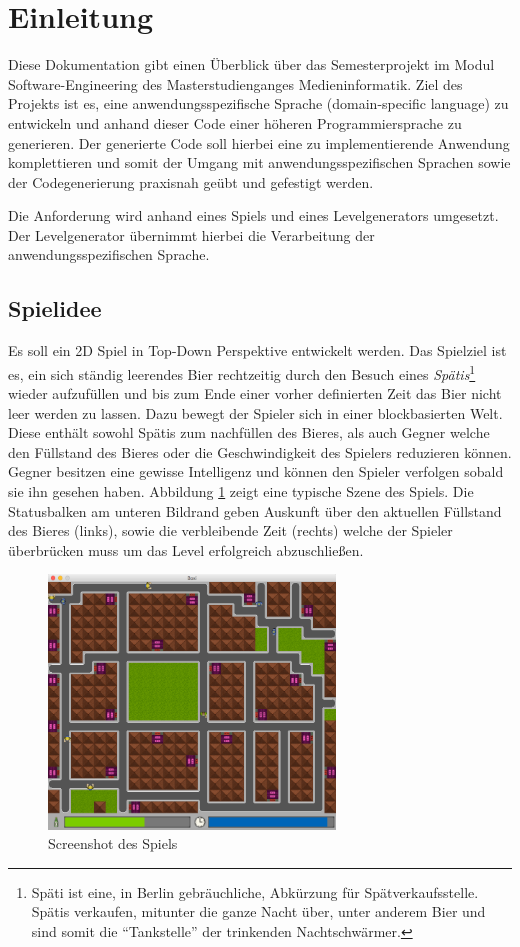 \section{Einleitung}

Diese Dokumentation gibt einen Überblick über das Semesterprojekt im Modul Software-Engineering des Masterstudienganges Medieninformatik.
Ziel des Projekts ist es, eine anwendungsspezifische Sprache (domain-specific language) zu entwickeln und anhand dieser Code einer höheren Programmiersprache zu generieren.
Der generierte Code soll hierbei eine zu implementierende Anwendung komplettieren und somit der Umgang mit anwendungsspezifischen Sprachen sowie der Codegenerierung praxisnah geübt und gefestigt werden.

Die Anforderung wird anhand eines Spiels und eines Levelgenerators umgesetzt.
Der Levelgenerator übernimmt hierbei die Verarbeitung der anwendungsspezifischen Sprache.

\subsection{Spielidee}

Es soll ein 2D Spiel in Top-Down Perspektive entwickelt werden.
Das Spielziel ist es, ein sich ständig leerendes Bier rechtzeitig durch den Besuch eines \textit{Spätis}\footnote{Späti ist eine, in Berlin gebräuchliche, Abkürzung für Spätverkaufsstelle. Spätis verkaufen, mitunter die ganze Nacht über, unter anderem Bier und sind somit die ``Tankstelle'' der trinkenden Nachtschwärmer.}
wieder aufzufüllen und bis zum Ende einer vorher definierten Zeit das Bier nicht leer werden zu lassen.
Dazu bewegt der Spieler sich in einer blockbasierten Welt.
Diese enthält sowohl Spätis zum nachfüllen des Bieres, als auch Gegner welche den Füllstand des Bieres oder die Geschwindigkeit des Spielers reduzieren können.
Gegner besitzen eine gewisse Intelligenz und können den Spieler verfolgen sobald sie ihn gesehen haben.
Abbildung \ref{fig:einleitung:screenshot} zeigt eine typische Szene des Spiels.
Die Statusbalken am unteren Bildrand geben Auskunft über den aktuellen Füllstand des Bieres (links), sowie die verbleibende Zeit (rechts) welche der Spieler überbrücken muss um das Level erfolgreich abzuschließen.

\begin{figure}[]
\centering
\includegraphics[width=3in]{img/02_screenshot.png}
\caption{Screenshot des Spiels}
\label{fig:einleitung:screenshot}
\end{figure}


